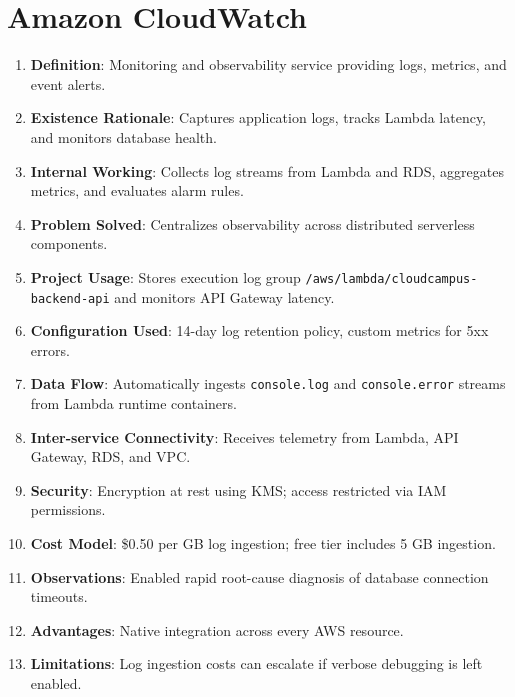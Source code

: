 \section{Amazon CloudWatch}
\begin{enumerate}
    \item \textbf{Definition}: Monitoring and observability service providing logs, metrics, and event alerts.
    \item \textbf{Existence Rationale}: Captures application logs, tracks Lambda latency, and monitors database health.
    \item \textbf{Internal Working}: Collects log streams from Lambda and RDS, aggregates metrics, and evaluates alarm rules.
    \item \textbf{Problem Solved}: Centralizes observability across distributed serverless components.
    \item \textbf{Project Usage}: Stores execution log group \texttt{/aws/lambda/cloudcampus-backend-api} and monitors API Gateway latency.
    \item \textbf{Configuration Used}: 14-day log retention policy, custom metrics for 5xx errors.
    \item \textbf{Data Flow}: Automatically ingests \texttt{console.log} and \texttt{console.error} streams from Lambda runtime containers.
    \item \textbf{Inter-service Connectivity}: Receives telemetry from Lambda, API Gateway, RDS, and VPC.
    \item \textbf{Security}: Encryption at rest using KMS; access restricted via IAM permissions.
    \item \textbf{Cost Model}: \$0.50 per GB log ingestion; free tier includes 5 GB ingestion.
    \item \textbf{Observations}: Enabled rapid root-cause diagnosis of database connection timeouts.
    \item \textbf{Advantages}: Native integration across every AWS resource.
    \item \textbf{Limitations}: Log ingestion costs can escalate if verbose debugging is left enabled.
\end{enumerate}

